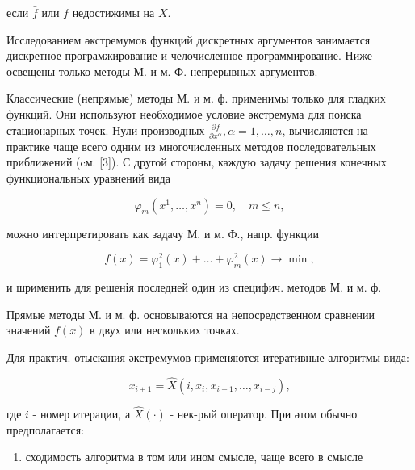 \documentclass[10pt]{article}
\begin{document}
если $\bar{f}$ или $\underline{f}$ недостижимы на $X$.



Исследованием әкстремумов функций дискретных аргументов занимается дискретное програмжирование и челочисленное программирование. Ниже освещены только методы М. и м. Ф. непрерывных аргументов.



Классические (непрямые) методы М. и м. ф. применимы только для гладких функций. Они используют необходимое условие әкстремума для поиска стационарных точек. Нули производных $\frac{\partial f}{\partial x^{\alpha}}, \alpha=1, \ldots, n$, вычисляются на практике чаще всего одним из многочисленных методов последовательных приближений (cм. [3]). С другой стороны, каждую задачу решения конечных функциональных уравнений вида



\[

\varphi_{m}\left(x^{1}, \ldots, x^{n}\right)=0, \quad m \leqslant n,

\]



можно интерпретировать как задачу М. и м. Ф., напр. функции



\[

f(x)=\varphi_{1}^{2}(x)+\ldots+\varphi_{m}^{2}(x) \longrightarrow \min ,

\]



и шрименить для решенія последней один из специфич. методов М. и м. ф.



Прямые методы М. и м. ф. основываются на непосредственном сравнении значений $f(x)$ в двух или нескольких точках.



Для практич. отыскания әкстремумов применяются итеративные алгоритмы вида:



\[

x_{i+1}=\hat{X}\left(i, x_{i}, x_{i-1}, \ldots, x_{i-j}\right),

\]



где $i$ - номер итерации, а $\widehat{X}(\cdot)$ - нек-рый оператор. При әтом обычно предполагается:



\begin{enumerate}

  \item сходимость алгоритма в том или ином смысле, чаще всего в смысле

\end{enumerate}
\end{document}
